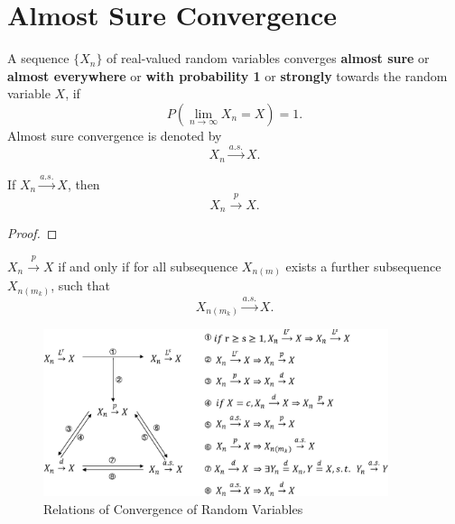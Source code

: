 \section{Almost Sure Convergence}

\begin{definition}
    A sequence $\{X_n\}$ of real-valued random variables converges \textbf{almost sure} or \textbf{almost everywhere} or \textbf{with probability 1} or \textbf{strongly} towards the random variable $X$, if
    \begin{equation}
        P\left(\lim_{n\to\infty}X_n=X\right)=1.
    \end{equation}
    Almost sure convergence is denoted by
    \begin{equation}
        X_n \stackrel{a.s.}{\rightarrow} X.
    \end{equation}
\end{definition}

\begin{remark}

\end{remark}

\begin{theorem}
    If $X_{n}\stackrel{a.s.}{\rightarrow}X$, then
    \begin{equation}
        X_{n}\stackrel{p}{\rightarrow}X.
    \end{equation}
\end{theorem}

\begin{proof}

\end{proof}

\begin{theorem}
    $X_n\stackrel{p}{\rightarrow}X$ if and only if for all subsequence $X_{n(m)}$ exists a further subsequence $X_{n(m_k)}$, such that
    \begin{equation}
        X_{n(m_k)}\stackrel{a.s.}{\rightarrow}X.
    \end{equation}
\end{theorem}

\begin{figure}[htp]
    \centering
    \includegraphics[width=0.9\textwidth]{./probability-theory/figures/relation-of-convergences.eps}
    \caption{Relations of Convergence of Random Variables}
\end{figure}

